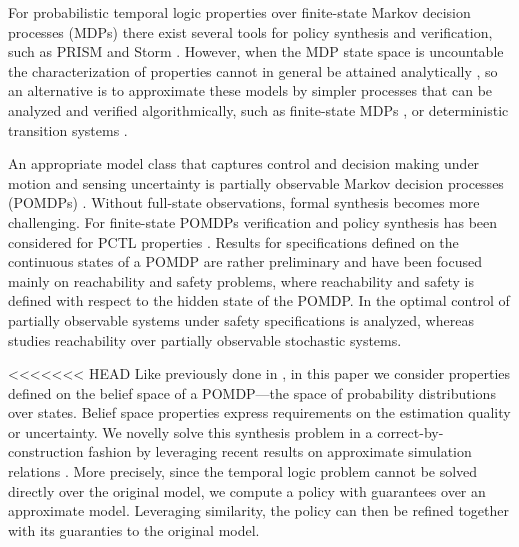 \documentclass{ifacconf}
\begin{document}
For probabilistic temporal logic properties over finite-state Markov decision processes (MDPs) there exist several tools for policy synthesis and verification, such as PRISM \citep{KNP11} and  Storm \citep{dehnert2017storm}. However, when the MDP state space is uncountable the characterization of properties cannot in general be attained analytically \citep{Abate1}, so an alternative is to approximate these models by simpler processes that can be analyzed and verified algorithmically, such as finite-state MDPs \citep{soudjani2015faust}, or deterministic transition systems \citep{Zamani2014}. %
 
An appropriate model class that captures control and decision making under motion and sensing uncertainty is partially observable Markov decision processes (POMDPs) \citep{Kaelbling98,Smallwood73}. Without full-state observations, formal synthesis becomes more challenging. For finite-state POMDPs verification and policy synthesis has been considered for PCTL properties \citep{Norman2017, Chatterjee2014}. Results for specifications defined on the continuous states of a POMDP are rather preliminary and have been focused mainly on reachability and safety problems, where reachability and safety is defined with respect to the hidden state of the POMDP. In \citep{ding2013optimal} the optimal control of partially observable systems under safety specifications is analyzed, whereas \citep{LESSER20141989} studies reachability over partially observable stochastic systems.
 
<<<<<<< HEAD
Like previously done in  \citep{Vasile2016,JonesDTL2013}, in this paper we consider properties defined on the belief space of a POMDP---the space of probability distributions over states. Belief space properties express requirements on the estimation quality or uncertainty. We novelly solve this synthesis problem in a  correct-by-construction fashion by leveraging recent results on  approximate simulation relations \citep{haesaert2017verification, tech_report_TACAS}.
More precisely, since the temporal logic problem cannot be solved directly over the original model, we compute a policy with guarantees over an approximate model. Leveraging similarity, the policy can then be refined together with  its guaranties  to the original model. 
\end{document}
